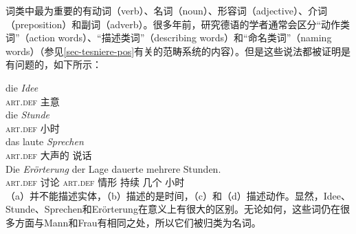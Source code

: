 词类中最为重要的有动词（verb）、名词（noun）、形容词（adjective）、介词（preposition）和副词（adverb）。很多年前，研究德语的学者通常会区分“动作类词”（action words）、“描述类词”（describing words）和“命名类词”（naming words）（参见\ref{sec-tesniere-pos}有关\tesc 的范畴系统的内容）。但是这些说法都被证明是有问题的，如下所示：

\eal
\ex 
\gll die \emph{Idee}\\
	\textsc{art}.\textsc{def} 主意\\
\ex 
\gll die \emph{Stunde}\\
	 \textsc{art}.\textsc{def} 小时\\
\ex 
\gll das laute \emph{Sprechen}\\
     \textsc{art}.\textsc{def} 大声的 说话\\
\ex 
\gll Die \emph{Erörterung} der Lage dauerte mehrere Stunden.\\
     \textsc{art}.\textsc{def} 讨论 \textsc{art}.\textsc{def} 情形 持续 几个 小时\\
\zl
（a）并不能描述实体，（b）描述的是时间，（c）和（d）描述动作。显然，Idee、Stunde、Sprechen和Erörterung在意义上有很大的区别。无论如何，这些词仍在很多方面与Mann和Frau有相同之处，所以它们被归类为名词。

